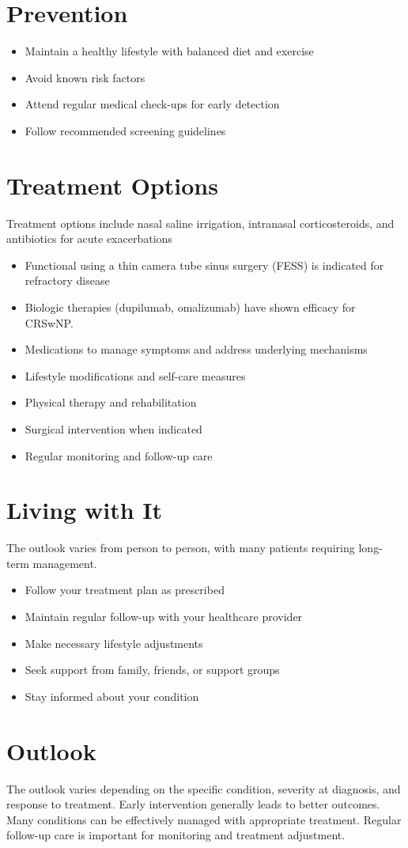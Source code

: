 \section{Prevention}
\begin{itemize}[noitemsep]
  \item Maintain a healthy lifestyle with balanced diet and exercise
  \item Avoid known risk factors
  \item Attend regular medical check-ups for early detection
  \item Follow recommended screening guidelines
\end{itemize}
\section{Treatment Options}
Treatment options include nasal saline irrigation, intranasal corticosteroids, and antibiotics for acute exacerbations

\begin{itemize}[noitemsep]
  \item Functional using a thin camera tube sinus surgery (FESS) is indicated for refractory disease
  \item Biologic therapies (dupilumab, omalizumab) have shown efficacy for CRSwNP.
  \item Medications to manage symptoms and address underlying mechanisms
  \item Lifestyle modifications and self-care measures
  \item Physical therapy and rehabilitation
  \item Surgical intervention when indicated
  \item Regular monitoring and follow-up care
\end{itemize}
\section{Living with It}
The outlook varies from person to person, with many patients requiring long-term management.

\begin{itemize}[noitemsep]
  \item Follow your treatment plan as prescribed
  \item Maintain regular follow-up with your healthcare provider
  \item Make necessary lifestyle adjustments
  \item Seek support from family, friends, or support groups
  \item Stay informed about your condition
\end{itemize}
\section{Outlook}
The outlook varies depending on the specific condition, severity at diagnosis, and response to treatment. Early intervention generally leads to better outcomes. Many conditions can be effectively managed with appropriate treatment. Regular follow-up care is important for monitoring and treatment adjustment.
